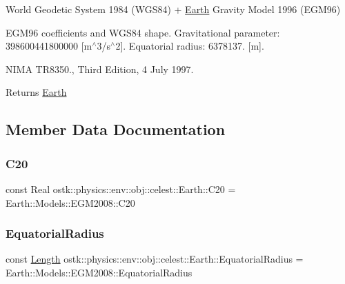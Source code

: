 World Geodetic System 1984 (W\+G\+S84) + \hyperlink{classostk_1_1physics_1_1env_1_1obj_1_1celest_1_1_earth}{Earth} Gravity Model 1996 (E\+G\+M96) 

E\+G\+M96 coefficients and W\+G\+S84 shape. Gravitational parameter\+: 398600441800000 \mbox{[}m$^\wedge$3/s$^\wedge$2\mbox{]}. Equatorial radius\+: 6378137. \mbox{[}m\mbox{]}.

N\+I\+MA T\+R8350., Third Edition, 4 July 1997.

\begin{DoxyReturn}{Returns}
\hyperlink{classostk_1_1physics_1_1env_1_1obj_1_1celest_1_1_earth}{Earth} 
\end{DoxyReturn}


\subsection{Member Data Documentation}
\mbox{\label{classostk_1_1physics_1_1env_1_1obj_1_1celest_1_1_earth_a51d8f851ef1f2c199dbf7707d9843eb4}} 
\subsubsection{\texorpdfstring{C20}{C20}}
{\footnotesize\ttfamily const Real ostk\+::physics\+::env\+::obj\+::celest\+::\+Earth\+::\+C20 = Earth\+::\+Models\+::\+E\+G\+M2008\+::\+C20\hspace{0.3cm}{\ttfamily [static]}}

\mbox{\label{classostk_1_1physics_1_1env_1_1obj_1_1celest_1_1_earth_ac700d34023a4654da6f781fc097034ad}} 
\subsubsection{\texorpdfstring{Equatorial\+Radius}{EquatorialRadius}}
{\footnotesize\ttfamily const \hyperlink{classostk_1_1physics_1_1units_1_1_length}{Length} ostk\+::physics\+::env\+::obj\+::celest\+::\+Earth\+::\+Equatorial\+Radius = Earth\+::\+Models\+::\+E\+G\+M2008\+::\+Equatorial\+Radius\hspace{0.3cm}{\ttfamily [static]}}

